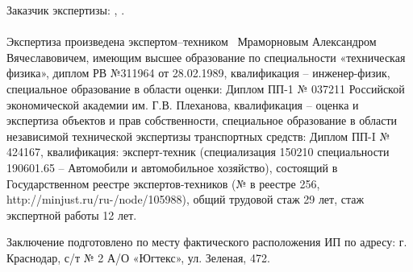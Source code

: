 Заказчик  экспертизы:  ,  .



\paragraph*{}
Экспертиза произведена  экспертом--техником
\,  Мраморновым Александром Вячеславовичем, имеющим высшее  образование по специальности «техническая физика», диплом РВ №311964 от 28.02.1989, квалификация -- инженер-физик, специальное образование в области оценки: Диплом ПП-1 № 037211 Российской экономической академии им. Г.В. Плеханова, квалификация -- оценка и экспертиза объектов и прав собственности, специальное образование в области независимой технической экспертизы транспортных средств: Диплом ПП-I № 424167, квалификация: эксперт-техник (специализация 150210 специальности 190601.65 – Автомобили и автомобильное хозяйство), состоящий в Государственном реестре экспертов-техников (№ в реестре 256, http://minjust.ru/ru-/node/105988),  общий трудовой  стаж 29 лет, стаж  экспертной работы  12 лет. \par Заключение подготовлено по месту фактического расположения ИП по адресу: г. Краснодар, с/т № 2 А/О «Югтекс», ул. Зеленая, 472.
